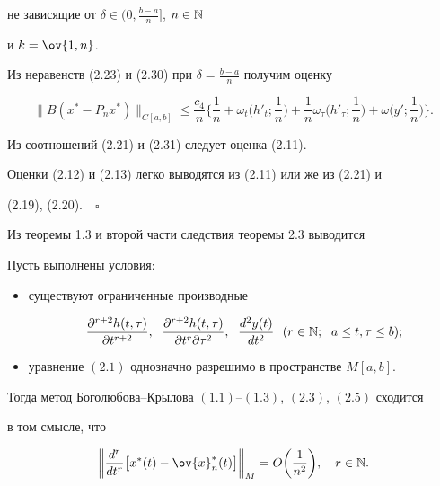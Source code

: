 не зависящие от $\delta \in \big(0,\frac{b-a}{n}\big]$, $n\in \Bbb N$


и $k=\ov{1,n}$.





Из неравенств (2.23) и (2.30) при $\delta =\frac{b-a}{n}$ получим оценку


\begin{equation}


\|B(x^*-P_nx^*)\|_{C[a,b]}\leq \frac{c_4}{n}\bigg\{\frac{1}{n}+


\omega_t\bigg(h'_t;\frac{1}{n}\bigg)+


\frac{1}{n}\omega_\tau\bigg(h'_\tau ;\frac{1}{n}\bigg)+


\omega\bigg(y';\frac{1}{n}\bigg)\bigg\}.


\end{equation}





Из соотношений (2.21) и (2.31) следует оценка (2.11).


Оценки (2.12) и (2.13) легко выводятся из (2.11) или же из (2.21) и


(2.19), (2.20).$\quad\square$





Из теоремы 1.3 и второй части следствия теоремы 2.3 выводится





\begin{thms}


Пусть выполнены условия\/${:}$


\begin{itemize}


\item[а)] существуют ограниченные производные


$$


\frac{\partial^{r+2} h(t,\tau)}{\partial t^{r+2}},\ \;


\frac{\partial^{r+2} h(t,\tau)}{\partial t^{r}\partial \tau^2},\ \;


\frac{d^2 y(t)}{d t^2} \ \ (r\in \bl{N};\ \; a\leq t,\tau\leq b);


$$


\item[б)] уравнение $(2.1)$ однозначно разрешимо в пространстве $M[a,b]$.


\end{itemize}


Тогда метод Боголюбова--Крылова $(1.1)$--$(1.3)$, $(2.3)$, $(2.5)$ сходится


в том смысле, что


\begin{equation}


\bigg\|\frac{d^r}{dt^r}\bigl[x^*(t)-\ov{x}_n^*(t)\bigr]\bigg\|_M=


O\bigg(\frac{1}{n^2}\bigg),\quad r\in \bl{N} .


\end{equation}


\end{thms}






